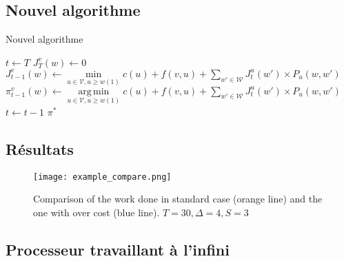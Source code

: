 \documentclass{beamer}
\DeclareMathOperator*{\argmin}{arg\,min}
\newcommand{\V}{\mathcal{V}}
\newcommand{\W}{\mathcal{W}}
\begin{document}
\subsection{Nouvel algorithme}

\begin{frame}{Nouvel algorithme}
  \begin{algorithm}[H]
    \caption{Algorithme dynamique de recherche d'une politique optimale
    prenant en compte le coût du changement de vitesse}
    \label{alg:chgspdalgo}  
    \begin{algorithmic}
      \STATE $t\leftarrow T$
      \FORALL{$w\in\W,v\in\V$}
      \STATE $J_T^v(w)\leftarrow0$
      \ENDFOR
      \FORALL{$w\in\W,v\in\V$}
      \STATE $J_{t-1}^v(w)\leftarrow \min\limits_{u\in\V,u\geq w(1)}
      c(u)+f(v,u)+\sum\limits_{w'\in\W}J_t^u(w')\times P_u(w,w')$
      \STATE $\pi_{t-1}^v(w)\leftarrow \argmin\limits_{u\in\V,u\geq w(1)}
      c(u)+f(v,u)+\sum\limits_{w'\in\W}J_t^u(w')\times P_u(w,w')$    
      \ENDFOR
      \STATE $t\leftarrow t-1$
      \ENDWHILE
      \RETURN $\pi^*$
    \end{algorithmic}
  \end{algorithm}
\end{frame}

\subsection{Résultats}

\begin{frame}
  \begin{figure}
    \centering
    \texttt{[image: example\_compare.png]}
    \caption{Comparison of the work done in standard case (orange line) and the one
      with over cost (blue line). $T=30,\Delta=4,S=3$}
    \label{fig:algo_overcost}
  \end{figure}
\end{frame}

\subsection{Processeur travaillant à l'infini}
\end{document}
